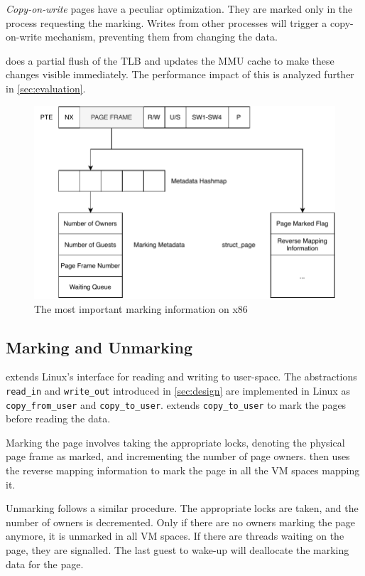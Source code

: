 \emph{Copy-on-write} pages have a peculiar optimization. They are marked only in
the process requesting the marking. Writes from other processes will trigger a
copy-on-write mechanism, preventing them from changing the data.

\sysname does a partial flush of the TLB and updates the MMU cache to make these
changes visible immediately. The performance impact of this is analyzed further
in \autoref{sec:evaluation}.

\begin{figure}[]
  \centering
  \includegraphics[width=\linewidth]{img/book-keeping.pdf}
  \caption{The most important marking information on x86}
  \label{fig:bookkeeping}
\end{figure}

\subsection{Marking and Unmarking}

\sysname extends Linux's interface for reading and writing to user-space. The
abstractions \texttt{read\_in} and \texttt{write\_out} introduced in
\autoref{sec:design} are implemented in Linux as \texttt{copy\_from\_user} and
\texttt{copy\_to\_user}. \sysname extends \texttt{copy\_to\_user} to mark the pages
before reading the data.

Marking the page involves taking the appropriate locks, denoting the physical
page frame as marked, and incrementing the number of page owners. \sysname then
uses the reverse mapping information to mark the page in all the VM spaces
mapping it.


Unmarking follows a similar procedure. The appropriate locks are taken, and the
number of owners is decremented. Only if there are no owners marking the page
anymore, it is unmarked in all VM spaces. If there are threads waiting on the
page, they are signalled. The last guest to wake-up will deallocate the marking
data for the page.

